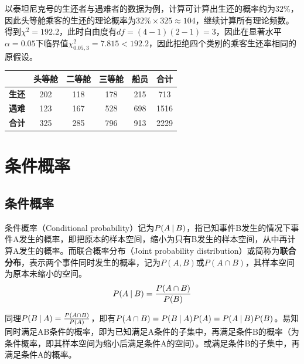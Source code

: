 \documentclass[11pt]{article}
\begin{document}
\begin{example}
    以泰坦尼克号的生还者与遇难者的数据为例，计算可计算出生还的概率约为$32\%$，因此头等舱乘客的生还的理论概率为$32\%\times 325 \approx 104$，继续计算所有理论频数。得到$\chi^2 = 192.2$，此时自由度有$df=(4-1)(2-1)=3$，因此在显著水平$\alpha=0.05$下临界值$\chi^2_{0.05,3} = 7.815 < 192.2$，因此拒绝四个类别的乘客生还率相同的原假设。
    \begin{table}[H]
    \centering
    \begin{tabular}{@{}cccccc@{}}
    \toprule
    & \textbf{头等舱} & \textbf{二等舱} & \textbf{三等舱} & \textbf{船员} & \textbf{合计} \\ \midrule
    \textbf{生还} & 202 & 118 & 178 & 215 & 713 \\
    \textbf{遇难} & 123 & 167 & 528 & 698 & 1516 \\
    \textbf{合计} & 325 & 285 & 796 & 913 & 2229 \\ \bottomrule
    \end{tabular}
    \end{table}
\end{example}

\section{条件概率}

\subsection{条件概率}

条件概率（Conditional probability）记为$P(A\:\vert\: B)$，指已知事件B发生的情况下事件A发生的概率，即把原本的样本空间，缩小为只有B发生的样本空间，从中再计算A发生的概率。而联合概率分布（Joint probability distribution）或简称为\textbf{联合分布}，表示两个事件同时发生的概率，记为$P(A,B)$或$P(A\cap B)$，其样本空间为原本未缩小的空间。
\begin{equation*}
    P(A \:\vert\: B) = \frac{P(A \cap B)}{P(B)}
\end{equation*}

\begin{remark}
    同理$P(B\:\vert\: A) = \frac{P(A \cap B)}{P(A)}$，即有$P(A \cap B) = P(B\:\vert\: A)P(A) = P(A\:\vert\: B)P(B)$。易知同时满足AB条件的概率，即为已知满足A条件的子集中，再满足条件B的概率（为条件概率，即其样本空间为缩小后满足条件A的空间）。或满足条件B的子集中，再满足条件A的概率。
\end{remark}
\end{document}
